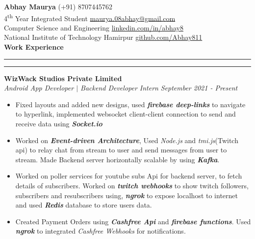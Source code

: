 \documentclass[11pt]{article}
\author{Abhay Maurya}
\begin{document}
	\LARGE{\textbf{Abhay Maurya}}
	\small
	\hfill
        (+91) 8707445762 \\
    4\textsuperscript{th} Year Integrated Student
    \hfill
        \href{mailto:maurya.08abhay@gmail.com}{\color{blue}maurya.08abhay@gmail.com}\\
    \hfill
        Computer Science and Engineering
    \hfill
        \href{https://www.linkedin.com/in/abhay8/}{\color{blue}linkedin.com/in/abhay8}\\
    \hfill
    National Institute of Technology Hamirpur
    \hfill
     	\href{https://github.com/Abhay811}{\color{blue}github.com/Abhay811}\\
    
    \vspace{4pt}
    \textbf{\large{Work Experience}}
    	\vspace{5pt}
    	\hrule \hrule
    	\vspace{4pt}
    	\textbf{WizWack Studios Private Limited}
    	\href{https://drive.google.com/file/d/1GKUMLnI26wRim3qdr-GsE-1DidYjr17D/view?usp=sharing}{\color{blue}}
    	\hfill
    	\\
    	\textit{Android App Developer $|$ Backend Developer Intern}
    	\hfill
    	\textit{September 2021 - Present}
    	\vspace{-6pt}
    	\begin{itemize}
    		\setlength{\itemsep}{0pt}
        	\setlength{\parskip}{0pt}
        	\setlength{\parsep}{0pt}
    		\item Fixed layouts and added new designs, used \textit{\textbf{firebase deep-links}} to navigate to hyperlink, implemented websocket client-client connection to send and receive data using \textit{\textbf{Socket.io}}
    		\item Worked on \textit{\textbf{Event-driven Architecture}}, Used \textit{Node.js} and \textit{tmi.js}(Twitch api) to relay chat from stream to user and send messages from user to stream. Made Backend server horizontally scalable by using \textit{\textbf{Kafka}}.
    		\item Worked on poller services for youtube subs Api for backend server, to fetch details of subscribers. Worked on \textit{\textbf{twitch webhooks}} to show twitch followers, subscribers and resubscribers using, \textit{\textbf{ngrok}} to expose localhost to internet and used \textit{\textbf{Redis}} database to store users data.
    		\item Created Payment Orders using \textit{\textbf{Cashfree Api}} and \textit{\textbf{firebase functions}}. Used \textit{\textbf{ngrok}} to integrated \textit{Cashfree Webhooks} for notifications.\\
    		
    	\end{itemize}
\end{document}
